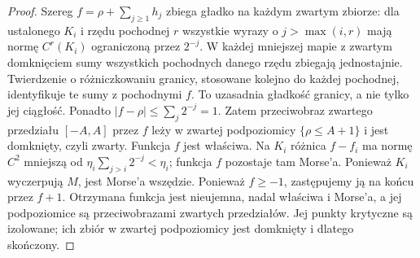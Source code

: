 \begin{proof}
Szereg $f=\rho+\sum_{j\geq1}h_j$
zbiega gładko na każdym zwartym
zbiorze: dla ustalonego $K_i$
i rzędu pochodnej $r$ wszystkie
wyrazy o $j>\max(i,r)$ mają normę
$C^r(K_i)$ ograniczoną przez
$2^{-j}$.
W każdej mniejszej mapie z zwartym domknięciem
sumy wszystkich pochodnych danego rzędu zbiegają jednostajnie.
Twierdzenie o różniczkowaniu granicy, stosowane kolejno
do każdej pochodnej, identyfikuje te sumy z pochodnymi $f$.
To uzasadnia gładkość granicy, a nie tylko jej ciągłość.
Ponadto
$|f-\rho|\leq\sum_j2^{-j}=1$.
Zatem przeciwobraz zwartego
przedziału $[-A,A]$ przez $f$
leży w zwartej podpoziomicy
$\{\rho\leq A+1\}$ i jest
domknięty, czyli zwarty.
Funkcja $f$ jest właściwa.
Na $K_i$ różnica $f-f_i$
ma normę $C^2$ mniejszą
od $\eta_i\sum_{j>i}2^{-j}
<\eta_i$; funkcja $f$
pozostaje tam Morse'a.
Ponieważ $K_i$ wyczerpują
$M$, jest Morse'a wszędzie. Ponieważ $f\geq-1$,
zastępujemy ją na końcu przez $f+1$. Otrzymana funkcja
jest nieujemna, nadal właściwa i Morse'a, a jej
podpoziomice są przeciwobrazami zwartych przedziałów.
Jej punkty krytyczne są izolowane;
ich zbiór w zwartej podpoziomicy
jest domknięty i dlatego skończony.
\end{proof}

